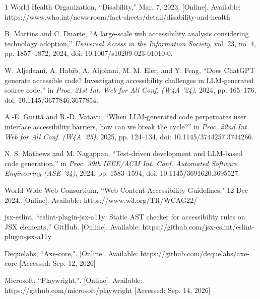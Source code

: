 \documentclass[conference]{IEEEtran}
\begin{document}
\begin{thebibliography}{1}
World Health Organization, ``Disability,'' Mar. 7, 2023. [Online]. Available: https://www.who.int/news-room/fact-sheets/detail/disability-and-health

  B. Martins and C. Duarte, ``A large-scale web accessibility analysis considering technology adoption,'' \emph{Universal Access in the Information Society}, vol. 23, no. 4, pp. 1857--1872, 2024, doi: 10.1007/s10209-023-01010-0.

  W. Aljedaani, A. Habib, A. Aljohani, M. M. Eler, and Y. Feng, ``Does ChatGPT generate accessible code? Investigating accessibility challenges in LLM-generated source code,'' in \emph{Proc. 21st Int. Web for All Conf. (W4A '24)}, 2024, pp. 165--176, doi: 10.1145/3677846.3677854.

  A.-E. Guriță and R.-D. Vatavu, ``When LLM-generated code perpetuates user interface accessibility barriers, how can we break the cycle?'' in \emph{Proc. 22nd Int. Web for All Conf. (W4A '25)}, 2025, pp. 124--134, doi: 10.1145/3744257.3744266.

  N. S. Mathews and M. Nagappan, ``Test-driven development and LLM-based code generation,'' in \emph{Proc. 39th IEEE/ACM Int. Conf. Automated Software Engineering (ASE '24)}, 2024, pp. 1583--1594, doi: 10.1145/3691620.3695527.

  World Wide Web Consortium, ``Web Content Accessibility Guidelines," 12 Dec 2024. [Online]. Available: https://www.w3.org/TR/WCAG22/
  
  jsx-eslint, ``eslint-plugin-jsx-a11y: Static AST checker for accessibility rules on JSX elements,'' GitHub. [Online]. Available: https://github.com/jsx-eslint/eslint-plugin-jsx-a11y

  Dequelabs, ``Axe-core,". [Online]. Available: https://github.com/dequelabs/axe-core [Accessed: Sep. 12, 2026]

  Microsoft, ``Playwright,". [Online]. Available: https://github.com/microsoft/playwright [Accessed: Sep. 14, 2026]
  

\end{thebibliography}
\end{document}
